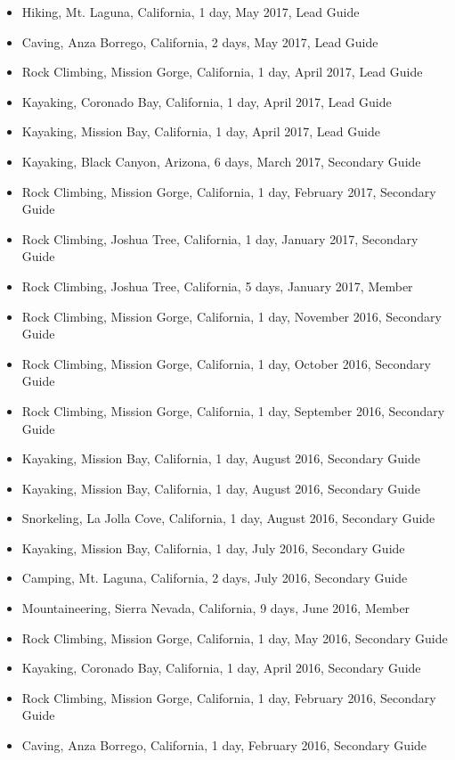 \documentclass[line,margin]{res}
\begin{document}
\begin{resume}
\begin{itemize}
		\item Hiking, Mt. Laguna, California, 1 day, May 2017, Lead Guide
		\item Caving, Anza Borrego, California, 2 days, May 2017, Lead Guide
		\item Rock Climbing, Mission Gorge, California, 1 day, April 2017, Lead Guide
		\item Kayaking, Coronado Bay, California, 1 day, April 2017, Lead Guide
		\item Kayaking, Mission Bay, California, 1 day, April 2017, Lead Guide
		\item Kayaking, Black Canyon, Arizona, 6 days, March 2017, Secondary Guide
		\item Rock Climbing, Mission Gorge, California, 1 day, February 2017, Secondary Guide
		\item Rock Climbing, Joshua Tree, California, 1 day, January 2017, Secondary Guide
		\item Rock Climbing, Joshua Tree, California, 5 days, January 2017, Member
		\item Rock Climbing, Mission Gorge, California, 1 day, November 2016, Secondary Guide
		\item Rock Climbing, Mission Gorge, California, 1 day, October 2016, Secondary Guide
		\item Rock Climbing, Mission Gorge, California, 1 day, September 2016, Secondary Guide
		\item Kayaking, Mission Bay, California, 1 day, August 2016, Secondary Guide
		\item Kayaking, Mission Bay, California, 1 day, August 2016, Secondary Guide
		\item Snorkeling, La Jolla Cove, California, 1 day, August 2016, Secondary Guide
		\item Kayaking, Mission Bay, California, 1 day, July 2016, Secondary Guide
		\item Camping, Mt. Laguna, California, 2 days, July 2016, Secondary Guide
		\item Mountaineering, Sierra Nevada, California, 9 days, June 2016, Member
		\item Rock Climbing, Mission Gorge, California, 1 day, May 2016, Secondary Guide
		\item Kayaking, Coronado Bay, California, 1 day, April 2016, Secondary Guide
		\item Rock Climbing, Mission Gorge, California, 1 day, February 2016, Secondary Guide
		\item Caving, Anza Borrego, California, 1 day, February 2016, Secondary Guide

\end{itemize}
\end{resume}
\end{document}
